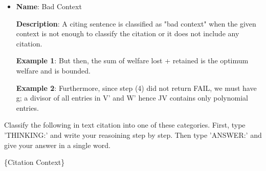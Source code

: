 \documentclass[sigconf]{acmart}
\begin{document}
\begin{itemize}
  \item \textbf{Name}: Bad Context
  
  \textbf{Description}: A citing sentence is classified as "bad context" when the given context is not enough to classify the citation or it does not include any citation.
  
  \textbf{Example 1}: But then, the sum of welfare lost + retained is the optimum welfare and is bounded.
  
  \textbf{Example 2}: Furthermore, since step (4) did not return FAIL, we must have g; a divisor of all entries in V' and W' hence JV contains only polynomial entries.  
\end{itemize}

Classify the following in text citation into one of these categories. First, type 'THINKING:' and write your reasoining step by step. Then type 'ANSWER:' and give your answer in a single word.

\{Citation Context\}
\end{document}
